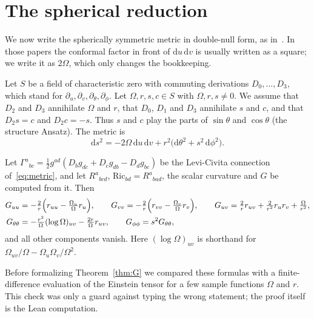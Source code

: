 \documentclass{lmcs}
\DeclareRobustCommand{\lean}[1]{{\ttfamily\def\_{\textunderscore\allowbreak}#1}}
\newcommand{\dd}{\mathrm{d}}
\begin{document}
\section{The spherical reduction}\label{sec:reduction}

We now write the spherically symmetric metric in double-null form, as in~\cite{Christodoulou1986,Dafermos2005}. In those papers the conformal factor in front of $\dd u\,\dd v$ is usually written as a square; we write it as $2\Omega$, which only changes the bookkeeping.

Let $S$ be a field of characteristic zero with commuting derivations $D_0,\dots,D_3$, which stand for $\partial_u,\partial_v,\partial_\theta,\partial_\phi$. Let $\Omega,r,s,c\in S$ with $\Omega,r,s\ne0$. We assume that $D_2$ and $D_3$ annihilate $\Omega$ and $r$, that $D_0$, $D_1$ and $D_3$ annihilate $s$ and $c$, and that $D_2s=c$ and $D_2c=-s$. Thus $s$ and $c$ play the parts of $\sin\theta$ and $\cos\theta$ (the structure \lean{Ansatz}). The metric is
\begin{equation}\label{eq:metric}
\dd s^2=-2\Omega\,\dd u\,\dd v+r^2\bigl(\dd\theta^2+s^2\,\dd\phi^2\bigr).
\end{equation}

\begin{thm}[\lean{christoffel}, \lean{G00}--\lean{G33}, \lean{G\_offdiag}]\label{thm:G}
Let $\Gamma^a{}_{bc}=\tfrac12g^{ad}(D_bg_{dc}+D_cg_{db}-D_dg_{bc})$ be the Levi-Civita connection of~\eqref{eq:metric}, and let $R^a{}_{bcd}$, $\mathrm{Ric}_{bd}=R^a{}_{bad}$, the scalar curvature and $G$ be computed from it. Then
\begin{align*}
G_{uu}&=-\tfrac{2}{r}\Bigl(r_{uu}-\tfrac{\Omega_u}{\Omega}r_u\Bigr),\qquad
G_{vv}=-\tfrac{2}{r}\Bigl(r_{vv}-\tfrac{\Omega_v}{\Omega}r_v\Bigr),\qquad
G_{uv}=\tfrac{2}{r}r_{uv}+\tfrac{2}{r^2}r_ur_v+\tfrac{\Omega}{r^2},\\
G_{\theta\theta}&=-\tfrac{r^2}{\Omega}(\log\Omega)_{uv}-\tfrac{2r}{\Omega}r_{uv},\qquad
G_{\phi\phi}=s^2G_{\theta\theta},
\end{align*}
and all other components vanish. Here $(\log\Omega)_{uv}$ is shorthand for $\Omega_{uv}/\Omega-\Omega_u\Omega_v/\Omega^2$.
\end{thm}

Before formalizing Theorem~\ref{thm:G} we compared these formulas with a finite-difference evaluation of the Einstein tensor for a few sample functions $\Omega$ and $r$. This check was only a guard against typing the wrong statement; the proof itself is the Lean computation.
\end{document}
